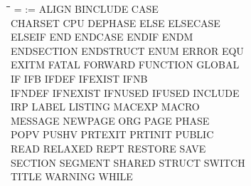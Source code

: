 {\tt\begin{tabbing}
\hspace{3cm}\=\hspace{3cm}\=\hspace{3cm}\=\hspace{3cm}\=\kill
=          \> :=          \> ALIGN       \> BINCLUDE    \> CASE \\
CHARSET    \> CPU         \> DEPHASE     \> ELSE        \> ELSECASE \\
ELSEIF     \> END         \> ENDCASE     \> ENDIF       \> ENDM \\
ENDSECTION \> ENDSTRUCT   \> ENUM        \> ERROR       \> EQU \\
EXITM      \> FATAL       \> FORWARD     \> FUNCTION    \> GLOBAL \\
IF         \> IFB         \> IFDEF       \> IFEXIST     \> IFNB \\
IFNDEF     \> IFNEXIST    \> IFNUSED     \> IFUSED      \> INCLUDE \\
IRP        \> LABEL       \> LISTING     \> MACEXP      \> MACRO \\
MESSAGE    \> NEWPAGE     \> ORG         \> PAGE        \> PHASE \\
POPV       \> PUSHV       \> PRTEXIT     \> PRTINIT     \> PUBLIC \\
READ       \> RELAXED     \> REPT        \> RESTORE     \> SAVE \\
SECTION    \> SEGMENT     \> SHARED      \> STRUCT      \> SWITCH \\
TITLE      \> WARNING     \> WHILE \\ 
\end{tabbing}}
